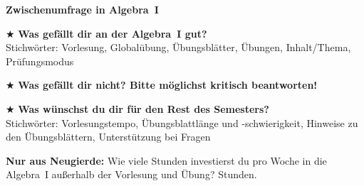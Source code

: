 \documentclass[12pt,a4paper,ngerman]{scrartcl}
\newcommand{\quest}[1]{$\bigstar$ #1 \vfill}
\newcommand{\neugierde}[1]{\textbf{Nur aus Neugierde:} #1}
\begin{document}
\begin{center}\Large\textbf{Zwischenumfrage in Algebra~I}\end{center}

\large

\quest{\textbf{Was gefällt dir an der Algebra~I gut?} \\
Stichwörter: Vorlesung, Globalübung, Übungsblätter, Übungen, Inhalt/Thema,
Prüfungsmodus}

\hrulefill

\quest{\textbf{Was gefällt dir nicht? Bitte möglichst kritisch beantworten!}}

\hrulefill

\quest{\textbf{Was wünschst du dir für den Rest des Semesters?} \\
Stichwörter: Vorlesungstempo, Übungsblattlänge und -schwierigkeit,
Hinweise zu den Übungsblättern, Unterstützung bei Fragen}

\hrulefill

\neugierde{{Wie viele Stunden investierst du pro Woche in die
Algebra~I außerhalb der Vorlesung und Übung?}}
\underline{\quad\qquad} Stunden.
\end{document}
